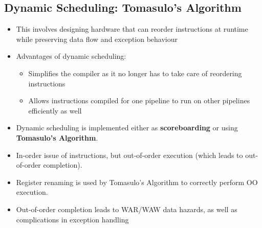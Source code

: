 \documentclass{article}
\begin{document}
\subsection{Dynamic Scheduling: Tomasulo's Algorithm}
\begin{itemize}
    \item This involves designing hardware that can reorder instructions at runtime while preserving data flow and exception behaviour
    
    \item Advantages of dynamic scheduling:
    \begin{itemize}
        \item Simplifies the compiler as it no longer has to take care of reordering instructions
        
        \item Allows instructions compiled for one pipeline to run on other pipelines efficiently as well
    \end{itemize}
    
    \item Dynamic scheduling is implemented either as \textbf{scoreboarding} or using \textbf{Tomasulo's Algorithm}. 
    
    \item In-order issue of instructions, but out-of-order execution (which leads to out-of-order completion).
    
    \item Register renaming is used by Tomasulo's Algorithm to correctly perform OO execution. 
     
    \item Out-of-order completion leads to WAR/WAW data hazards, as well as complications in exception handling 
\end{itemize}
\end{document}
